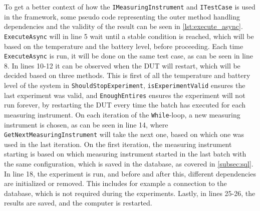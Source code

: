 To get a better context of how the \texttt{IMeasuringInstrument} and \texttt{ITestCase} is used in the framework, some pseudo code representing the outer method handling dependencies and the validity of the result can be seen in \cref{lst:execute_async}. \texttt{ExecuteAsync} will in line 5 wait until a stable condition is reached, which will be based on the temperature and the battery level, before proceeding. Each time \texttt{ExecuteAsync} is run, it will be done on the same test case, as can be seen in line 8. In lines 10-12 it can be observed when the DUT will restart, which will be decided based on three methods. This is first of all the temperature and battery level of the system in \texttt{ShouldStopExperiment}, \texttt{isExperimentValid} ensures the last experiment was valid, and \texttt{EnoughEntires} ensures the experiment will not run forever, by restarting the DUT every time the batch has executed for each measuring instrument. On each iteration of the \texttt{While}-loop, a new measuring instrument is chosen, as can be seen in line 14, where \texttt{GetNextMeasuringInstrument} will take the next one, based on which one was used in the last iteration. On the first iteration, the measuring instrument starting is based on which measuring instrument started in the last batch with the same configuration, which is saved in the database, as covered in \cref{subsec:sql}. In line 18, the experiment is run, and before and after this, different dependencies are initialized or removed. This includes for example a connection to the database, which is not required during the experiments. Lastly, in lines 25-26, the results are saved, and the computer is restarted. 



